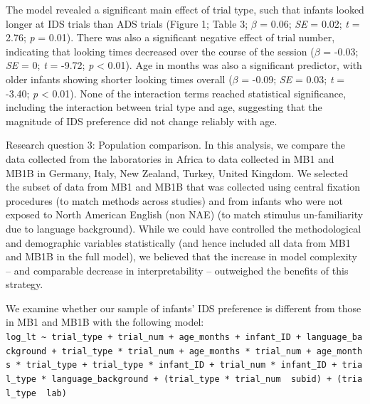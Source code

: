 \documentclass[
  ,man,floatsintext]{apa6}
\begin{document}
The model revealed a significant main effect of trial type, such that infants looked longer at IDS trials than ADS trials (Figure 1; Table 3; \emph{\(\beta\)} = 0.06; \emph{SE} = 0.02; \emph{t} = 2.76; \emph{p} = 0.01). There was also a significant negative effect of trial number, indicating that looking times decreased over the course of the session (\emph{\(\beta\)} = -0.03; \emph{SE} = 0; \emph{t} = -9.72; \emph{p} \textless{} 0.01). Age in months was also a significant predictor, with older infants showing shorter looking times overall (\emph{\(\beta\)} = -0.09; \emph{SE} = 0.03; \emph{t} = -3.40; \emph{p} \textless{} 0.01). None of the interaction terms reached statistical significance, including the interaction between trial type and age, suggesting that the magnitude of IDS preference did not change reliably with age.

Research question 3: Population comparison. In this analysis, we compare the data collected from the laboratories in Africa to data collected in MB1 and MB1B in Germany, Italy, New Zealand, Turkey, United Kingdom. We selected the subset of data from MB1 and MB1B that was collected using central fixation procedures (to match methods across studies) and from infants who were not exposed to North American English (non NAE) (to match stimulus un-familiarity due to language background). While we could have controlled the methodological and demographic variables statistically (and hence included all data from MB1 and MB1B in the full model), we believed that the increase in model complexity -- and comparable decrease in interpretability -- outweighed the benefits of this strategy.

We examine whether our sample of infants' IDS preference is different from those in MB1 and MB1B with the following model:
\texttt{log\_lt\ \textasciitilde{}\ trial\_type\ +\ trial\_num\ +\ age\_months\ +\ infant\_ID\ +\ language\_background\ +\ trial\_type\ *\ trial\_num\ +\ age\_months\ *\ trial\_num\ +\ age\_months\ *\ trial\_type\ +\ trial\_type\ *\ infant\_ID\ +\ trial\_num\ *\ infant\_ID\ +\ trial\_type\ *\ language\_background\ +\ (trial\_type\ *\ trial\_num\ \textbar{}\ subid)\ +\ (trial\_type\ \textbar{}\ lab)}
\end{document}
